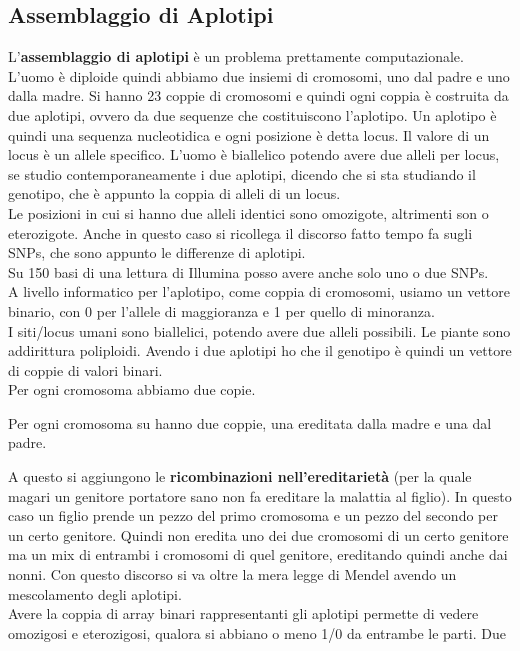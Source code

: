 \documentclass[a4paper,12pt, oneside]{book}
\begin{document}
\subsection{Assemblaggio di Aplotipi}
L'\textbf{assemblaggio di aplotipi} è un problema prettamente computazionale.\\
L'uomo è diploide quindi abbiamo due insiemi di cromosomi, uno dal padre e uno
dalla madre. Si hanno 23 coppie di cromosomi e quindi ogni coppia è costruita da
due aplotipi, ovvero da due sequenze che costituiscono l'aplotipo. Un aplotipo è
quindi una sequenza nucleotidica e ogni posizione è detta locus. Il valore di un
locus è un allele specifico. L'uomo è biallelico potendo avere due alleli per
locus, se studio contemporaneamente i due aplotipi, dicendo che si sta studiando
il genotipo, che è appunto la coppia di alleli di un locus.\\
Le posizioni in cui si hanno due alleli identici sono omozigote, altrimenti son
o eterozigote. Anche in questo caso si ricollega il discorso fatto tempo fa
sugli SNPs, che sono appunto le differenze di aplotipi.\\
Su 150 basi di una lettura di Illumina posso avere anche solo uno o due SNPs.\\
A livello informatico per l'aplotipo, come coppia di cromosomi, usiamo un
vettore binario, con 0 per l'allele di maggioranza e 1 per quello di
minoranza. \\
I siti/locus umani sono biallelici, potendo avere due alleli possibili. Le
piante sono addirittura poliploidi. Avendo i due aplotipi ho che il genotipo è
quindi un vettore di coppie di valori binari.\\
Per ogni cromosoma abbiamo due copie.
\begin{teorema}
  Per ogni cromosoma su hanno due coppie, una ereditata dalla madre e una dal
  padre. 
\end{teorema}
A questo si aggiungono le \textbf{ricombinazioni nell'ereditarietà} (per la
quale magari un genitore portatore sano non fa ereditare la malattia al figlio).
In questo caso un figlio prende un pezzo del primo cromosoma e un pezzo del
secondo per un certo genitore. Quindi non eredita uno dei due cromosomi di un
certo genitore ma un mix di entrambi i cromosomi di quel genitore, ereditando
quindi anche dai nonni.
Con questo discorso si va oltre la mera legge di Mendel avendo un mescolamento
degli aplotipi. \\
Avere la coppia di array binari rappresentanti gli aplotipi permette di vedere
omozigosi e eterozigosi, qualora si abbiano o meno 1/0 da entrambe le parti. Due
\end{document}
